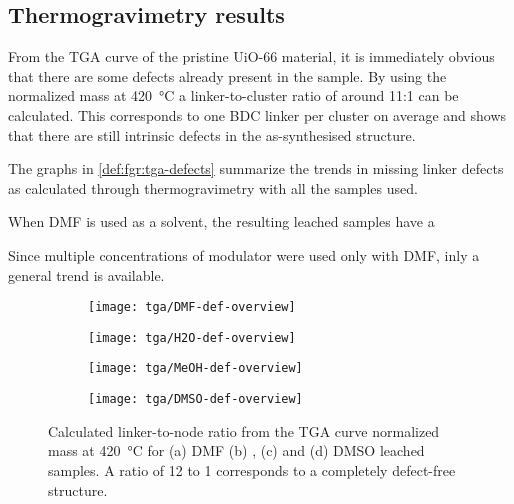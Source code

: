 
\subsection{Thermogravimetry results}

From the TGA curve of the pristine UiO-66 material, 
it is immediately obvious that there are some defects 
already present in the sample. By using the normalized
mass at \SI{420}{\degreeCelsius} a linker-to-cluster 
ratio of around 11:1 can be calculated. This corresponds 
to one BDC linker per cluster on average and shows that
there are still intrinsic defects in the as-synthesised 
structure.

The graphs in \autoref{def:fgr:tga-defects} summarize the 
trends in missing linker defects as calculated through 
thermogravimetry with all the samples used.

When DMF is used as a solvent, the resulting leached samples 
have a 

Since multiple concentrations of modulator were used only with 
DMF, inly a general trend is available.


\begin{figure}[htb]
    \centering

    \begin{subfigure}{0.45\linewidth}
        \texttt{[image: tga/DMF-def-overview]}%
        \label{def:fgr:tga-dmf-linkers}
    \end{subfigure}
    \begin{subfigure}{0.45\linewidth}
        \texttt{[image: tga/H2O-def-overview]}%
        \label{def:fgr:tga-h2o-linkers}
    \end{subfigure}

    
    \begin{subfigure}{0.45\linewidth}
        \texttt{[image: tga/MeOH-def-overview]}%
        \label{def:fgr:tga-meoh-linkers}
    \end{subfigure}
    \begin{subfigure}{0.45\linewidth}
        \texttt{[image: tga/DMSO-def-overview]}%
        \label{def:fgr:tga-dmso-linkers}
    \end{subfigure}

    \caption{Calculated linker-to-node ratio from the TGA curve 
    normalized mass at \SI{420}{\degreeCelsius} for (a) DMF 
    (b) , (c)  and (d) DMSO leached samples.
    A ratio of 12 to 1 corresponds to a completely defect-free
    structure.}%
    \label{def:fgr:tga-defects}
    
\end{figure}
